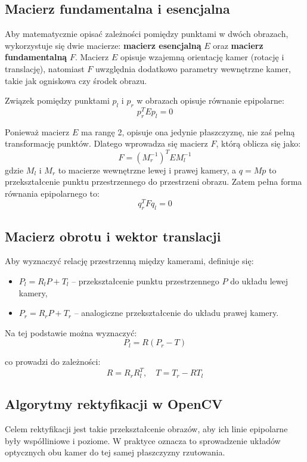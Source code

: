 \documentclass[magisterska]{pracadypl}
\begin{document}
\subsection{Macierz fundamentalna i esencjalna}

Aby matematycznie opisać zależności pomiędzy punktami w dwóch obrazach, wykorzystuje się dwie macierze: \textbf{macierz esencjalną} $E$ oraz \textbf{macierz fundamentalną} $F$. Macierz $E$ opisuje wzajemną orientację kamer (rotację i translację), natomiast $F$ uwzględnia dodatkowo parametry wewnętrzne kamer, takie jak ogniskowa czy środek obrazu.

Związek pomiędzy punktami $p_l$ i $p_r$ w obrazach opisuje równanie epipolarne:
\[
p_r^T E p_l = 0
\]

Ponieważ macierz $E$ ma rangę 2, opisuje ona jedynie płaszczyznę, nie zaś pełną transformację punktów. Dlatego wprowadza się macierz $F$, którą oblicza się jako:
\[
F = (M_r^{-1})^T E M_l^{-1}
\]
gdzie $M_l$ i $M_r$ to macierze wewnętrzne lewej i prawej kamery, a $q = M p$ to przekształcenie punktu przestrzennego do przestrzeni obrazu. Zatem pełna forma równania epipolarnego to:
\[
q_r^T F q_l = 0
\]

\subsection{Macierz obrotu i wektor translacji}

Aby wyznaczyć relację przestrzenną między kamerami, definiuje się:

\begin{itemize}
    \item $P_l = R_l P + T_l$ – przekształcenie punktu przestrzennego $P$ do układu lewej kamery,
    \item $P_r = R_r P + T_r$ – analogiczne przekształcenie do układu prawej kamery.
\end{itemize}

Na tej podstawie można wyznaczyć:
\[
P_l = R(P_r - T)
\]

co prowadzi do zależności:
\[
R = R_r R_l^T, \quad T = T_r - R T_l
\]

\subsection{Algorytmy rektyfikacji w OpenCV}

Celem rektyfikacji jest takie przekształcenie obrazów, aby ich linie epipolarne były współliniowe i poziome. W praktyce oznacza to sprowadzenie układów optycznych obu kamer do tej samej płaszczyzny rzutowania.
\end{document}
